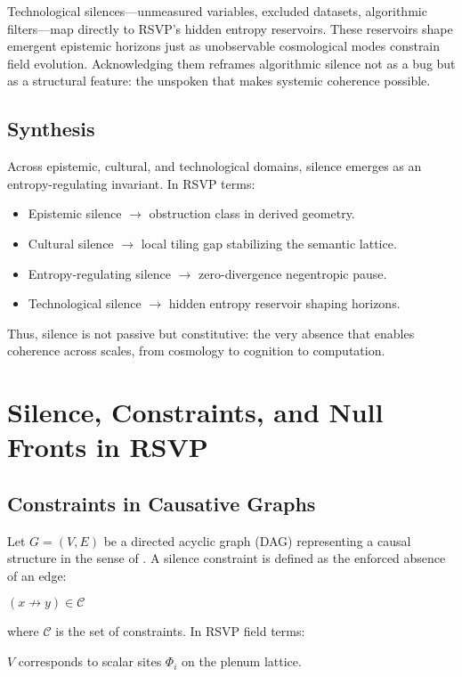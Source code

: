 \documentclass[12pt,a4paper]{article}
\begin{document}
Technological silences—unmeasured variables, excluded datasets, algorithmic filters—map directly to RSVP’s hidden entropy reservoirs. These reservoirs shape emergent epistemic horizons just as unobservable cosmological modes constrain field evolution. Acknowledging them reframes algorithmic silence not as a bug but as a structural feature: the unspoken that makes systemic coherence possible.

\subsection{Synthesis}

Across epistemic, cultural, and technological domains, silence emerges as an entropy-regulating invariant. In RSVP terms:

\begin{itemize}
\item Epistemic silence $\to$ obstruction class in derived geometry.
\item Cultural silence $\to$ local tiling gap stabilizing the semantic lattice.
\item Entropy-regulating silence $\to$ zero-divergence negentropic pause.
\item Technological silence $\to$ hidden entropy reservoir shaping horizons.
\end{itemize}

Thus, silence is not passive but constitutive: the very absence that enables coherence across scales, from cosmology to cognition to computation.

\section{Silence, Constraints, and Null Fronts in RSVP}

\subsection{Constraints in Causative Graphs}

Let $G = (V,E)$ be a directed acyclic graph (DAG) representing a causal structure in the sense of \citet{Pearl2009}. A silence constraint is defined as the enforced absence of an edge:

$(x \not\to y) \in \mathcal{C}$

where $\mathcal{C}$ is the set of constraints. In RSVP field terms:

$V$ corresponds to scalar sites $\Phi_i$ on the plenum lattice.
\end{document}

